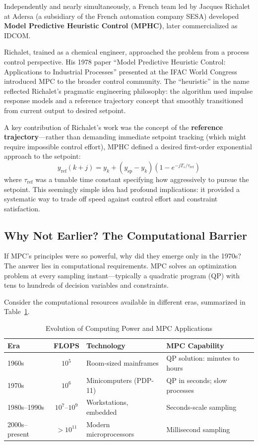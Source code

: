 Independently and nearly simultaneously, a French team led by Jacques Richalet at Adersa (a subsidiary of the French automation company SESA) developed \textbf{Model Predictive Heuristic Control (MPHC)}, later commercialized as IDCOM.

Richalet, trained as a chemical engineer, approached the problem from a process control perspective. His 1978 paper ``Model Predictive Heuristic Control: Applications to Industrial Processes'' presented at the IFAC World Congress introduced MPC to the broader control community. The ``heuristic'' in the name reflected Richalet's pragmatic engineering philosophy: the algorithm used impulse response models and a reference trajectory concept that smoothly transitioned from current output to desired setpoint.

A key contribution of Richalet's work was the concept of the \textbf{reference trajectory}---rather than demanding immediate setpoint tracking (which might require impossible control effort), MPHC defined a desired first-order exponential approach to the setpoint:
\begin{equation}
    y_{\text{ref}}(k+j) = y_k + (y_{\text{sp}} - y_k)(1 - e^{-j T_s / \tau_{\text{ref}}})
\end{equation}
where $\tau_{\text{ref}}$ was a tunable time constant specifying how aggressively to pursue the setpoint. This seemingly simple idea had profound implications: it provided a systematic way to trade off speed against control effort and constraint satisfaction.

\subsection{Why Not Earlier? The Computational Barrier}

If MPC's principles were so powerful, why did they emerge only in the 1970s? The answer lies in computational requirements. MPC solves an optimization problem at every sampling instant---typically a quadratic program (QP) with tens to hundreds of decision variables and constraints.

Consider the computational resources available in different eras, summarized in Table~\ref{tab:mpc_computing_history}.

\begin{table}[htbp]
\centering
\caption{Evolution of Computing Power and MPC Applications}
\label{tab:mpc_computing_history}
\begin{tabular}{lcll}
\toprule
\textbf{Era} & \textbf{FLOPS} & \textbf{Technology} & \textbf{MPC Capability} \\
\midrule
1960s & $10^5$ & Room-sized mainframes & QP solution: minutes to hours \\
1970s & $10^6$ & Minicomputers (PDP-11) & QP in seconds; slow processes \\
1980s--1990s & $10^7$--$10^9$ & Workstations, embedded & Seconds-scale sampling \\
2000s--present & $>10^{11}$ & Modern microprocessors & Millisecond sampling \\
\bottomrule
\end{tabular}
\end{table}

